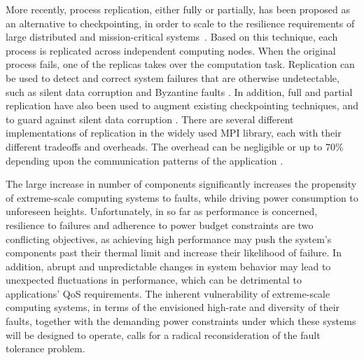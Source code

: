 More recently, process replication, either fully or partially, has been proposed as an alternative to checkpointing, in order to scale to the resilience requirements of large distributed and mission-critical systems~\cite{fiala_2012_sdc,riesen_sandia_2010,lefray_2013_rsd,Cappello:09:Fault}. Based on this technique, each process is replicated across independent computing
nodes. When the original process fails, one of the replicas takes over the computation task. Replication can be used to detect and correct system failures that are otherwise undetectable,
such as silent data corruption \cite{ni_2013_acr} and Byzantine faults \cite{fiala_2012_sdc}. 
In addition, full and partial
replication have also been used to augment existing checkpointing techniques, and to guard
against silent data corruption \cite{stearly_2012_partial,elliott_2012_cpr}. There are several different implementations of
replication in the widely used MPI library, each with their different tradeoffs and overheads. The
overhead can be negligible or up to 70\% depending upon the communication patterns of the
application \cite{engelmann2011redundant}.


The large increase in number of components significantly increases the propensity of extreme-scale computing systems to faults, while driving power consumption to unforeseen heights. Unfortunately, in so far as performance is concerned, resilience to failures and adherence to power budget constraints are two conflicting objectives, as achieving high performance may push the system's components past their thermal limit and increase their likelihood of failure.
In addition, abrupt and unpredictable changes in system behavior may lead to unexpected fluctuations in performance, which can be detrimental to applications' QoS requirements. The inherent vulnerability of extreme-scale computing systems, in terms of the envisioned high-rate and diversity of their faults, together with the demanding power constraints under which these systems will be designed to operate, calls for a radical reconsideration of the fault tolerance problem.

